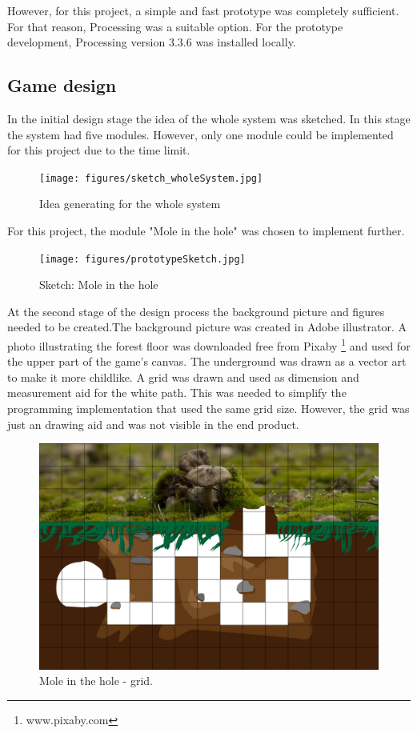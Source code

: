 However, for this project, a simple and fast prototype was completely sufficient. For that reason, Processing was a suitable option. For the prototype development, Processing version 3.3.6 was installed locally.


\subsection{Game design}

In the initial design stage the idea of the whole system was sketched. In this stage the system had five modules. However, only one module could be implemented for this project due to the time limit.

\begin{figure}[h]  %
  \centering
  \texttt{[image: figures/sketch\_wholeSystem.jpg]}
  \caption[Idea generating.]{ Idea generating for the whole system}
  \label{fig:setup}
\end{figure}

For this project, the module "Mole in the hole" was chosen to implement further.

\begin{figure}[!h]  %
  \centering
  \texttt{[image: figures/prototypeSketch.jpg]}
  \caption[Sketch Mole in the hole.]{Sketch: Mole in the hole}
  \label{fig:setup}
\end{figure}

At the second stage of the design process the background picture and figures needed to be created.The background picture was created in Adobe illustrator. A photo illustrating the forest floor was downloaded free from Pixaby \footnote{www.pixaby.com} and used for the upper part of the game’s canvas. The underground was drawn as a vector art to make it more childlike. 
A grid was drawn and used as dimension and measurement aid for the white path. This was needed to simplify the programming implementation that used the same grid size. However, the grid was just an drawing aid and was not visible in the end product.

\begin{figure}[h]  %
  \centering
  \includegraphics[width=.5\textwidth]{figures/Mole-in-the-hole-800x1200-GRID.jpg}
  \caption[Mole in the hole grid.]{Mole in the hole - grid.}
  \label{fig:setup}
\end{figure}

